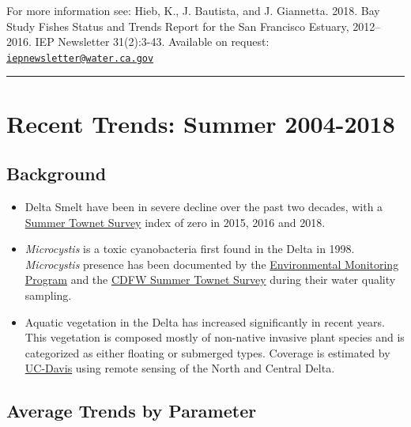 \documentclass[
]{book}
\providecommand{\tightlist}{%
  \setlength{\itemsep}{0pt}\setlength{\parskip}{0pt}}
\begin{document}
\begin{disclaimer}
For more information see: Hieb, K., J. Bautista, and J. Giannetta. 2018.
Bay Study Fishes Status and Trends Report for the San Francisco Estuary,
2012--2016. IEP Newsletter 31(2):3-43. Available on request:
\href{mailto:iepnewsletter@water.ca.gov}{\nolinkurl{iepnewsletter@water.ca.gov}}
\end{disclaimer}

\begin{center}\rule{0.5\linewidth}{0.5pt}\end{center}

\hypertarget{recent-trends-summer-2004-2018}{%
\section{Recent Trends: Summer 2004-2018}\label{recent-trends-summer-2004-2018}}

\hypertarget{background-5}{%
\subsection{Background}\label{background-5}}

\begin{itemize}
\tightlist
\item
  Delta Smelt have been in severe decline over the past two decades, with a \href{https://wildlife.ca.gov/Conservation/Delta/Townet-Survey}{Summer Townet Survey} index of zero in 2015, 2016 and 2018.
\item
  \emph{Microcystis} is a toxic cyanobacteria first found in the Delta in 1998. \emph{Microcystis} presence has been documented by the \href{https://emp.baydeltalive.com/wiki/12297}{Environmental Monitoring Program} and the \href{https://wildlife.ca.gov/Conservation/Delta/Townet-Survey}{CDFW Summer Townet Survey} during their water quality sampling.
\item
  Aquatic vegetation in the Delta has increased significantly in recent years. This vegetation is composed mostly of non-native invasive plant species and is categorized as either floating or submerged types. Coverage is estimated by \href{http://cstars.metro.ucdavis.edu/}{UC-Davis} using remote sensing of the North and Central Delta.
\end{itemize}

\hypertarget{average-trends-by-parameter}{%
\subsection{Average Trends by Parameter}\label{average-trends-by-parameter}}
\end{document}
